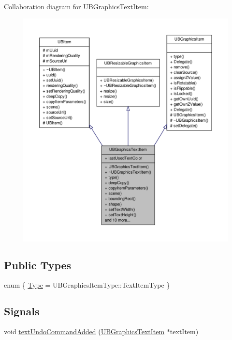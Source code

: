 Collaboration diagram for U\-B\-Graphics\-Text\-Item\-:
\nopagebreak
\begin{figure}[H]
\begin{center}
\leavevmode
\includegraphics[width=350pt]{d9/d11/class_u_b_graphics_text_item__coll__graph}
\end{center}
\end{figure}
\subsection*{Public Types}
\begin{DoxyCompactItemize}
\item 
enum \{ \hyperlink{class_u_b_graphics_text_item_a8c363fe2aad7d560e8132f7b2f551f64a89d6e26f73d521f2aa319b661c5ff01a}{Type} =  U\-B\-Graphics\-Item\-Type\-:\-:Text\-Item\-Type
 \}
\end{DoxyCompactItemize}
\subsection*{Signals}
\begin{DoxyCompactItemize}
\item 
void \hyperlink{class_u_b_graphics_text_item_a1b9e41208efe10b9d640ee45c2e2dcec}{text\-Undo\-Command\-Added} (\hyperlink{class_u_b_graphics_text_item}{U\-B\-Graphics\-Text\-Item} $\ast$text\-Item)
\end{DoxyCompactItemize}
